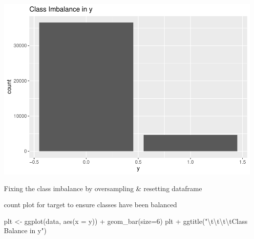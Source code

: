 \documentclass[
]{article}
\newenvironment{Shaded}{\begin{snugshade}}{\end{snugshade}}
\newcommand{\AttributeTok}[1]{\textcolor[rgb]{0.77,0.63,0.00}{#1}}
\newcommand{\DecValTok}[1]{\textcolor[rgb]{0.00,0.00,0.81}{#1}}
\newcommand{\FunctionTok}[1]{\textcolor[rgb]{0.00,0.00,0.00}{#1}}
\newcommand{\NormalTok}[1]{#1}
\newcommand{\OtherTok}[1]{\textcolor[rgb]{0.56,0.35,0.01}{#1}}
\newcommand{\SpecialCharTok}[1]{\textcolor[rgb]{0.00,0.00,0.00}{#1}}
\newcommand{\StringTok}[1]{\textcolor[rgb]{0.31,0.60,0.02}{#1}}
\begin{document}
\includegraphics{part1_files/figure-latex/unnamed-chunk-10-1.pdf}

Fixing the class imbalance by oversampling \& resetting dataframe

\begin{Shaded}
\end{Shaded}

count plot for target to ensure classes have been balanced

\begin{Shaded}
\begin{Highlighting}[]
\NormalTok{plt }\OtherTok{\textless{}{-}} \FunctionTok{ggplot}\NormalTok{(data, }\FunctionTok{aes}\NormalTok{(}\AttributeTok{x =}\NormalTok{ y)) }\SpecialCharTok{+} \FunctionTok{geom\_bar}\NormalTok{(}\AttributeTok{size=}\DecValTok{6}\NormalTok{) }
\NormalTok{plt }\SpecialCharTok{+} \FunctionTok{ggtitle}\NormalTok{(}\StringTok{"}\SpecialCharTok{\textbackslash{}t\textbackslash{}t\textbackslash{}t\textbackslash{}t}\StringTok{Class Balance in y"}\NormalTok{)}
\end{Highlighting}
\end{Shaded}
\end{document}
